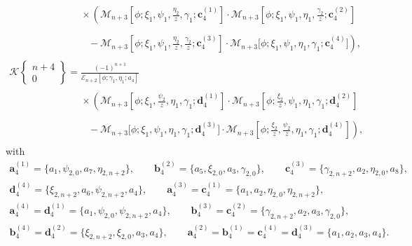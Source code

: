 \documentclass[10pt,a4paper]{amsart}
\numberwithin{equation}{section}
\newcommand{\ga}{\gamma}
\begin{document}
\begin{gather*}
\phantom{\mathscr{K}\left\lbrace \begin{matrix} 0 \\ n+4 \end{matrix} \right\rbrace =}{}\times \left( \mathscr{M}_{n+3}\left[\phi; \xi_1, \psi_1, \frac{\eta_2}{z}, \ga_1; \boldsymbol{c}^{(1)}_4\right]\cdot \mathscr{M}_{n+3}\left[\phi; \xi_1, \psi_1, \eta_1, \frac{\ga_2}{z}; \boldsymbol{c}^{(2)}_4\right] \right. \\
 \phantom{\mathscr{K}\left\lbrace \begin{matrix} 0 \\ n+4 \end{matrix} \right\rbrace =\times}{} - \left. \mathscr{M}_{n+3}\left[\phi; \xi_1, \psi_1, \frac{\eta_2}{z},\frac{\ga_2}{z}; \boldsymbol{c}^{(3)}_4\right]\cdot \mathscr{M}_{n+3}\big[\phi; \xi_1, \psi_1, \eta_1, \ga_1; \boldsymbol{c}^{(4)}_4\big] \right),
\\
				\mathscr{K}\left\lbrace \begin{matrix} n+4 \\ 0 \end{matrix} \right\rbrace = \frac{(-1)^{n+1}}{\mathscr{E}_{n+2}[\phi;\ga_1,\eta_1;a_4]} \\
\phantom{\mathscr{K}\left\lbrace \begin{matrix} n+4 \\ 0 \end{matrix} \right\rbrace =}{}\times \left( \mathscr{M}_{n+3}\left[\phi; \xi_1,\frac{\psi_2}{z}, \eta_1, \ga_1; \boldsymbol{d}^{(1)}_4\right]\cdot \mathscr{M}_{n+3}\left[\phi; \frac{\xi_2}{z}, \psi_1, \eta_1, \ga_1; \boldsymbol{d}^{(2)}_4\right] \right. \\
\phantom{\mathscr{K}\left\lbrace \begin{matrix} n+4 \\ 0 \end{matrix} \right\rbrace =\times }{}- \left. \mathscr{M}_{n+3}\big[\phi; \xi_1, \psi_1, \eta_1, \ga_1; \boldsymbol{d}^{(3)}_4\big]\cdot \mathscr{M}_{n+3}\left[\phi; \frac{\xi_2}{z}, \frac{\psi_2}{z}, \eta_1, \ga_1; \boldsymbol{d}^{(4)}_4\right] \right),
		\end{gather*}
		with
		\begin{gather*}
			\boldsymbol{a}^{(1)}_4 = \{a_1, \psi_{2,0}, a_7, \eta_{2,n+2} \},\qquad	 \boldsymbol{b}^{(2)}_4 = \{a_5, \xi_{2,0}, a_3, \ga_{2,0}\}, \qquad		
			\boldsymbol{c}^{(3)}_4 = \{\ga_{2,n+2}, a_2, \eta_{2,0}, a_8\},		\\
	\boldsymbol{d}^{(4)}_4 = \{\xi_{2,n+2},a_6, \psi_{2,n+2}, a_4\},	\qquad
			\boldsymbol{a}^{(3)}_4 = \boldsymbol{c}^{(1)}_4 = \{a_1, a_2, \eta_{2,0}, \eta_{2,n+2}\},\\
 \boldsymbol{a}^{(4)}_4 = \boldsymbol{d}^{(1)}_4 = \{a_1, \psi_{2,0}, \psi_{2,n+2}, a_4\}, \qquad \boldsymbol{b}^{(3)}_4 = \boldsymbol{c}^{(2)}_4 = \{\ga_{2,n+2}, a_2, a_3,\ga_{2,0}\}, \\
 \boldsymbol{b}^{(4)}_4 = 	\boldsymbol{d}^{(2)}_4 = \{\xi_{2,n+2}, \xi_{2,0}, a_3, a_4\}, \qquad
			\boldsymbol{a}^{(2)}_4 = \boldsymbol{b}^{(1)}_4 = \boldsymbol{c}^{(4)}_4 = \boldsymbol{d}^{(3)}_4 = \{a_1, a_2, a_3, a_4\}.
		\end{gather*}
\end{document}
